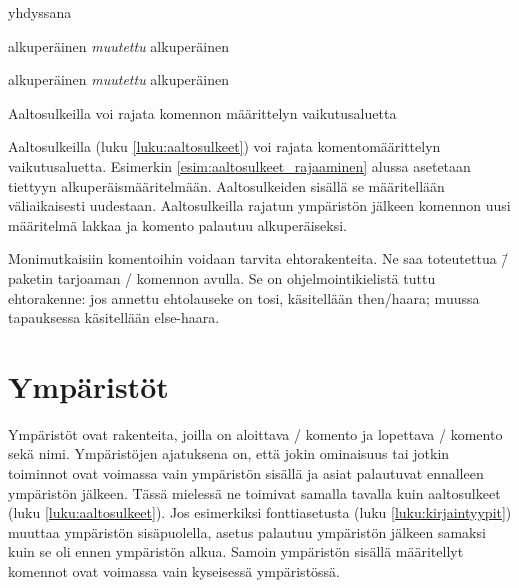 \begin{tulossis}
  yhdyssana
\end{tulossis}

\begin{esimerkki*}
\begin{koodilohko}
\newcommand{\komento}{alkuperäinen}
\komento
{%
  \renewcommand{\komento}{\textit{muutettu}}
  \komento
}
\komento
\end{koodilohko}
\begin{tulos}
  alkuperäinen \textit{muutettu} alkuperäinen
\end{tulos}
\caption{Aaltosulkeilla voi rajata komennon määrittelyn
  vaikutusaluetta}
\label{esim:aaltosulkeet_rajaaminen}
\end{esimerkki*}

Aaltosulkeilla (luku \ref{luku:aaltosulkeet}) voi rajata
komentomäärittelyn vaikutusaluetta. Esimerkin
\ref{esim:aaltosulkeet_rajaaminen} alussa asetetaan 
tiettyyn alkuperäismääritelmään. Aaltosulkeiden sisällä se määritellään
väliaikaisesti uudestaan. Aaltosulkeilla rajatun ympäristön jälkeen
komennon uusi määritelmä lakkaa ja komento palautuu alkuperäiseksi.

Monimutkaisiin komentoihin voidaan tarvita ehtorakenteita. Ne saa
toteutettua \=/ paketin tarjoaman
\-/ komennon avulla. Se on ohjelmointikielistä
tuttu ehtorakenne: jos annettu ehtolauseke on tosi, käsitellään
then\-/haara; muussa tapauksessa käsitellään else-haara.

\section{Ympäristöt}
\label{luku:ymparistot}

Ympäristöt ovat rakenteita, joilla on aloittava \-/
komento ja lopettava \-/ komento sekä nimi. Ympäristöjen
ajatuksena on, että jokin ominaisuus tai jotkin toiminnot ovat voimassa
vain ympäristön sisällä ja asiat palautuvat ennalleen ympäristön
jälkeen. Tässä mielessä ne toimivat samalla tavalla kuin aaltosulkeet
(luku \ref{luku:aaltosulkeet}). Jos esimerkiksi fonttiasetusta (luku
\ref{luku:kirjaintyypit}) muuttaa ympäristön sisäpuolella, asetus
palautuu ympäristön jälkeen samaksi kuin se oli ennen ympäristön alkua.
Samoin ympäristön sisällä määritellyt komennot ovat voimassa vain
kyseisessä ympäristössä.

\begin{koodilohkosis}
\begin{nimi}
\end{nimi}
\end{koodilohkosis}

